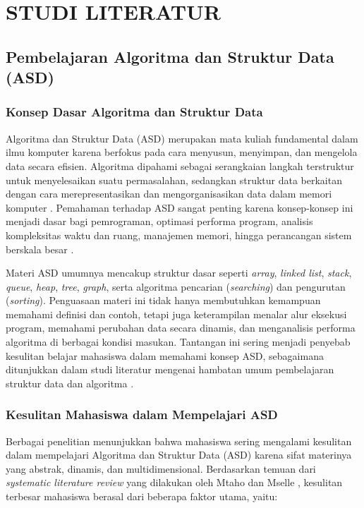 \chapter{STUDI LITERATUR}
\label{chap:studi-literatur}

\section{Pembelajaran Algoritma dan Struktur Data (ASD)}

\subsection{Konsep Dasar Algoritma dan Struktur Data}

Algoritma dan Struktur Data (ASD) merupakan mata kuliah fundamental dalam ilmu komputer karena berfokus pada cara menyusun, menyimpan, dan mengelola data secara efisien. Algoritma dipahami sebagai serangkaian langkah terstruktur untuk menyelesaikan suatu permasalahan, sedangkan struktur data berkaitan dengan cara merepresentasikan dan mengorganisasikan data dalam memori komputer \cite{Cormen2009CLRS}. Pemahaman terhadap ASD sangat penting karena konsep-konsep ini menjadi dasar bagi pemrograman, optimasi performa program, analisis kompleksitas waktu dan ruang, manajemen memori, hingga perancangan sistem berskala besar \cite{Goodrich1998DSAJava}.

Materi ASD umumnya mencakup struktur dasar seperti \textit{array}, \textit{linked list}, \textit{stack}, \textit{queue}, \textit{heap}, \textit{tree}, \textit{graph}, serta algoritma pencarian (\textit{searching}) dan pengurutan (\textit{sorting}). Penguasaan materi ini tidak hanya membutuhkan kemampuan memahami definisi dan contoh, tetapi juga keterampilan menalar alur eksekusi program, memahami perubahan data secara dinamis, dan menganalisis performa algoritma di berbagai kondisi masukan. Tantangan ini sering menjadi penyebab kesulitan belajar mahasiswa dalam memahami konsep ASD, sebagaimana ditunjukkan dalam studi literatur mengenai hambatan umum pembelajaran struktur data dan algoritma \cite{Mtaho2024}.

\subsection{Kesulitan Mahasiswa dalam Mempelajari ASD}

Berbagai penelitian menunjukkan bahwa mahasiswa sering mengalami kesulitan dalam mempelajari Algoritma dan Struktur Data (ASD) karena sifat materinya yang abstrak, dinamis, dan multidimensional. Berdasarkan temuan dari \textit{systematic literature review} yang dilakukan oleh Mtaho dan Mselle \cite{Mtaho2024}, kesulitan terbesar mahasiswa berasal dari beberapa faktor utama, yaitu:

